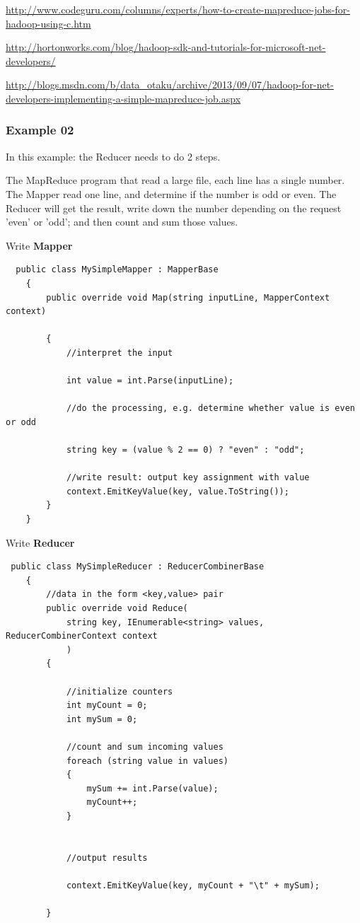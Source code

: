 \url{http://www.codeguru.com/columns/experts/how-to-create-mapreduce-jobs-for-hadoop-using-c.htm}

\url{http://hortonworks.com/blog/hadoop-sdk-and-tutorials-for-microsoft-net-developers/}

\url{http://blogs.msdn.com/b/data_otaku/archive/2013/09/07/hadoop-for-net-developers-implementing-a-simple-mapreduce-job.aspx}

\subsubsection{Example 02 }

In this example: the Reducer needs to do 2 steps.

The MapReduce program that read a large file, each line has a single number. The
Mapper read one line, and determine if the number is odd or even. The Reducer
will get the result, write down the number depending on the request 'even' or
'odd'; and then count and sum  those values.

Write {\bf Mapper}
\begin{verbatim}
  public class MySimpleMapper : MapperBase
    {
        public override void Map(string inputLine, MapperContext context)

        {
            //interpret the input

            int value = int.Parse(inputLine);

            //do the processing, e.g. determine whether value is even or odd

            string key = (value % 2 == 0) ? "even" : "odd";

            //write result: output key assignment with value
            context.EmitKeyValue(key, value.ToString());
        }
    }
\end{verbatim}

Write {\bf Reducer}
\begin{verbatim}
 public class MySimpleReducer : ReducerCombinerBase
    {
        //data in the form <key,value> pair
        public override void Reduce(
            string key, IEnumerable<string> values, ReducerCombinerContext context
            )
        {

            //initialize counters
            int myCount = 0;
            int mySum = 0;

            //count and sum incoming values
            foreach (string value in values)
            {
                mySum += int.Parse(value);
                myCount++;
            }
 

            //output results

            context.EmitKeyValue(key, myCount + "\t" + mySum);

        }
\end{verbatim}



